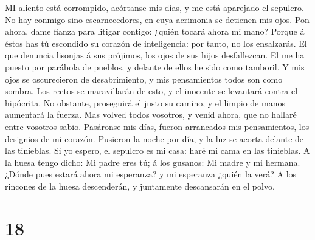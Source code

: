  MI aliento está corrompido, acórtanse mis días, y me está
aparejado el sepulcro.  No hay conmigo sino
escarnecedores, en cuya acrimonia se detienen mis ojos. 
Pon ahora, dame fianza para litigar contigo: ¿quién tocará ahora mi
mano?  Porque á éstos has tú escondido su corazón de
inteligencia: por tanto, no los ensalzarás.  El que
denuncia lisonjas á sus prójimos, los ojos de sus hijos desfallezcan.
 El me ha puesto por parábola de pueblos, y delante de
ellos he sido como tamboril.  Y mis ojos se oscurecieron
de desabrimiento, y mis pensamientos todos son como sombra.
 Los rectos se maravillarán de esto, y el inocente se
levantará contra el hipócrita.  No obstante, proseguirá el
justo su camino, y el limpio de manos aumentará la fuerza.
 Mas volved todos vosotros, y venid ahora, que no hallaré
entre vosotros sabio.  Pasáronse mis días, fueron
arrancados mis pensamientos, los designios de mi corazón.
 Pusieron la noche por día, y la luz se acorta delante de
las tinieblas.  Si yo espero, el sepulcro es mi casa:
haré mi cama en las tinieblas.  A la huesa tengo dicho:
Mi padre eres tú; á los gusanos: Mi madre y mi hermana. 
¿Dónde pues estará ahora mi esperanza? y mi esperanza ¿quién la verá?
 A los rincones de la huesa descenderán, y juntamente
descansarán en el polvo.

\hypertarget{section-17}{%
\section{18}\label{section-17}}

